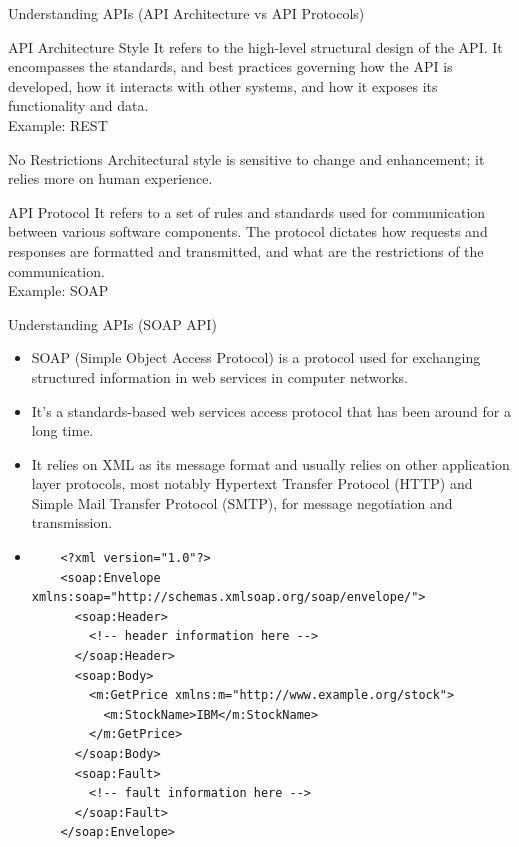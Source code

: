 \documentclass{beamer}
\begin{document}
\begin{frame}[t]{Understanding APIs \small (API Architecture vs API Protocols)}
  \begin{block}{API Architecture Style}  
   \scriptsize It refers to the high-level structural design of the API. It encompasses the standards, and best practices governing how the API is developed, how it interacts with other systems, and how it exposes its functionality and data.\\
   \color{teal} Example: REST
  \end{block}
  
  \begin{alertblock}{No Restrictions}
    \scriptsize Architectural style is sensitive to change and enhancement; it relies more on human experience.
  \end{alertblock}
  
  
  \begin{block}{API Protocol}
    \scriptsize It refers to a set of rules and standards used for communication between various software components. The protocol dictates how requests and responses are formatted and transmitted, and what are the restrictions of the communication.\\
    \color{teal} Example: SOAP
  \end{block}
\end{frame}

\begin{frame}[fragile,t]{Understanding APIs \small (SOAP API)}
  
  \begin{itemize}
    \scriptsize
    \item<1-> SOAP (Simple Object Access Protocol) is a protocol used for exchanging structured information in web services in computer networks. 
    \item<2-> It's a standards-based web services access protocol that has been around for a long time. 
	\item<3-> It relies on XML as its message format and usually relies on other application layer protocols, most notably Hypertext Transfer Protocol (HTTP) and Simple Mail Transfer Protocol (SMTP), for message negotiation and transmission.
	\item<4->[] 
	\tiny 
	\begin{lstlisting}
    <?xml version="1.0"?>
    <soap:Envelope xmlns:soap="http://schemas.xmlsoap.org/soap/envelope/">
      <soap:Header>
        <!-- header information here -->
      </soap:Header>
      <soap:Body>
        <m:GetPrice xmlns:m="http://www.example.org/stock">
          <m:StockName>IBM</m:StockName>
        </m:GetPrice>
      </soap:Body>
      <soap:Fault>
        <!-- fault information here -->
      </soap:Fault>
    </soap:Envelope>
    \end{lstlisting}

  \end{itemize}
  
\end{frame}
 
\end{document}

